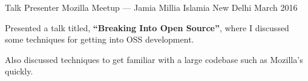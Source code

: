 
\begin{cventries}

\cventry%
  {Talk Presenter} %
  {Mozilla Meetup --- Jamia Millia Islamia} %
  {New Delhi} %
  {March 2016} %
  {%
    \begin{cvitems} %
      \item{Presented a talk titled, \textbf{``Breaking Into Open Source''}, where I
            discussed some techniques for getting into OSS development.}
      \item{Also discussed techniques to get familiar with a large codebase
            such as Mozilla's quickly.}
    \end{cvitems}
  }

\end{cventries}
